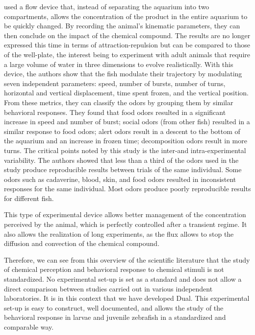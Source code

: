     \cite{kermen2020stimulus} used a flow device that, instead of separating the aquarium into two compartments, allows the concentration of the product in the entire aquarium to be quickly changed. By recording the animal's kinematic parameters, they can then conclude on the impact of the chemical compound. The results are no longer expressed this time in terms of attraction-repulsion but can be compared to those of the well-plate, the interest being to experiment with adult animals that require a large volume of water in three dimensions to evolve realistically. With this device, the authors show that the fish modulate their trajectory by modulating seven independent parameters: speed, number of bursts, number of turns, horizontal and vertical displacement, time spent frozen, and the vertical position. From these metrics, they can classify the odors by grouping them by similar behavioral responses. They found that food odors resulted in a significant increase in speed and number of burst; social odors (from other fish) resulted in a similar response to food odors; alert odors result in a descent to the bottom of the aquarium and an increase in frozen time; decomposition odors result in more turns.
    The critical points noted by this study is the inter-and intra-experimental variability. The authors showed that less than a third of the odors used in the study produce reproducible results between trials of the same individual. Some odors such as cadaverine, blood, skin, and food odors resulted in inconsistent responses for the same individual. Most odors produce poorly reproducible results for different fish.

    This type of experimental device allows better management of the concentration perceived by the animal, which is perfectly controlled after a transient regime. It also allows the realization of long experiments, as the flux allows to stop the diffusion and convection of the chemical compound.

    Therefore, we can see from this overview of the scientific literature that the study of chemical perception and behavioral response to chemical stimuli is not standardized. No experimental set-up is set as a standard and does not allow a direct comparison between studies carried out in various independent laboratories. It is in this context that we have developed Dual. This experimental set-up is easy to construct, well documented, and allows the study of the behavioral response in larvae and juvenile zebrafish in a standardized and comparable way.


